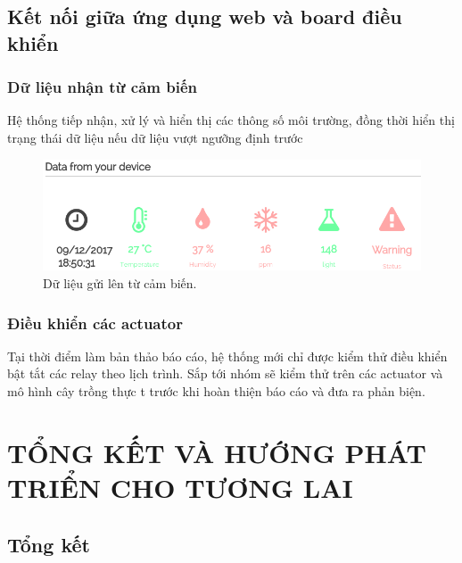 \documentclass[a4paper,12pt,oneside]{article}
\begin{document}
\subsection{Kết nối giữa ứng dụng web và board điều khiển}

\subsubsection{Dữ liệu nhận từ cảm biến}
\noindent Hệ thống tiếp nhận, xử lý và hiển thị các thông số môi trường, đồng thời hiển thị trạng thái dữ liệu nếu dữ liệu vượt ngưỡng định trước

	\begin{figure}[H]
	\begin{center}
	\includegraphics[scale=.7]{hinh/data.PNG}
	\end{center}
	\caption{Dữ liệu gửi lên từ cảm biến.}
	\end{figure}
\subsubsection{Điều khiển các actuator}
\noindent Tại thời điểm làm bản thảo báo cáo, hệ thống mới chỉ được kiểm thử điều khiển bật tắt các relay theo lịch trình. Sắp tới nhóm sẽ kiểm thử trên các actuator và mô hình cây trồng thực t trước khi hoàn thiện báo cáo và đưa ra phản biện.

\newpage
\section{TỔNG KẾT VÀ HƯỚNG PHÁT TRIỂN CHO TƯƠNG LAI}
\subsection{Tổng kết}
\end{document}
